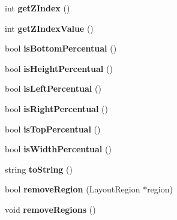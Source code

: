 \begin{CompactItemize}
\item 
int \textbf{getZIndex} ()\label{classbr_1_1pucrio_1_1telemidia_1_1ginga_1_1ncl_1_1model_1_1presentation_1_1FormatterDeviceRegion_aac307ba5df7f0caf14deb9d885d0444}

\item 
int \textbf{getZIndexValue} ()\label{classbr_1_1pucrio_1_1telemidia_1_1ginga_1_1ncl_1_1model_1_1presentation_1_1FormatterDeviceRegion_26e20bf362f6bcd2061d7e7e6f990006}

\item 
bool \textbf{isBottomPercentual} ()\label{classbr_1_1pucrio_1_1telemidia_1_1ginga_1_1ncl_1_1model_1_1presentation_1_1FormatterDeviceRegion_45fdcb6ccf00f51fb0828b73c8e46f64}

\item 
bool \textbf{isHeightPercentual} ()\label{classbr_1_1pucrio_1_1telemidia_1_1ginga_1_1ncl_1_1model_1_1presentation_1_1FormatterDeviceRegion_487739236637761bc0debafedc0f40d4}

\item 
bool \textbf{isLeftPercentual} ()\label{classbr_1_1pucrio_1_1telemidia_1_1ginga_1_1ncl_1_1model_1_1presentation_1_1FormatterDeviceRegion_9a9961b2d2468711cb7ac4ede1483094}

\item 
bool \textbf{isRightPercentual} ()\label{classbr_1_1pucrio_1_1telemidia_1_1ginga_1_1ncl_1_1model_1_1presentation_1_1FormatterDeviceRegion_9eb64edc426ab0373b48ad69f45cbc36}

\item 
bool \textbf{isTopPercentual} ()\label{classbr_1_1pucrio_1_1telemidia_1_1ginga_1_1ncl_1_1model_1_1presentation_1_1FormatterDeviceRegion_2d45586eac131e1db41e9faf07d5fb29}

\item 
bool \textbf{isWidthPercentual} ()\label{classbr_1_1pucrio_1_1telemidia_1_1ginga_1_1ncl_1_1model_1_1presentation_1_1FormatterDeviceRegion_47ef8349790f53a03ee416a83b210e58}

\item 
string \textbf{toString} ()\label{classbr_1_1pucrio_1_1telemidia_1_1ginga_1_1ncl_1_1model_1_1presentation_1_1FormatterDeviceRegion_2a35b0d68ef09ad99a22fa8563e1797f}

\item 
bool \textbf{removeRegion} (LayoutRegion $\ast$region)\label{classbr_1_1pucrio_1_1telemidia_1_1ginga_1_1ncl_1_1model_1_1presentation_1_1FormatterDeviceRegion_09842188309fe29e0281461c3defd44a}

\item 
void \textbf{removeRegions} ()\label{classbr_1_1pucrio_1_1telemidia_1_1ginga_1_1ncl_1_1model_1_1presentation_1_1FormatterDeviceRegion_94299b8b0b6510b3951ce9e4a4c947c0}


\end{CompactItemize}
